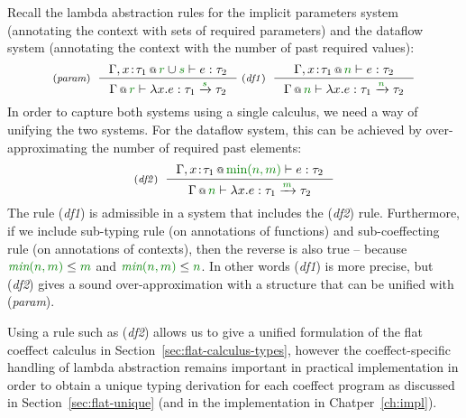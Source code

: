 Recall the lambda abstraction rules for the implicit parameters system (annotating the context
with sets of required parameters) and the dataflow system (annotating the context with the
number of past required values):
%
\begin{equation*}
\tyrule{param}
  {\coctx{\Gamma, x\!:\!\tau_1}{\cclrd{r} \cup \cclrd{s}} \vdash e : \tau_2}
  {\coctx{\Gamma}{\cclrd{r}} \vdash \lambda x.e : \tau_1 \xrightarrow{\cclrd{s}} \tau_2 }
\;
\tyrule{df1}
  {\coctx{\Gamma, x\!:\!\tau_1}{\cclrd{n}} \vdash e : \tau_2}
  {\coctx{\Gamma}{\cclrd{n}} \vdash \lambda x.e : \tau_1 \xrightarrow{\cclrd{n}} \tau_2 }
\end{equation*}
%
In order to capture both systems using a single calculus, we need a way of unifying the two
systems. For the dataflow system, this can be achieved by over-approximating the number of
required past elements:
%
\begin{equation*}
\tyrule{df2}
  {\coctx{\Gamma, x\!:\!\tau_1}{\cclrd{\textnormal{min}(n, m)}} \vdash e : \tau_2}
  {\coctx{\Gamma}{\cclrd{n}} \vdash \lambda x.e : \tau_1 \xrightarrow{\cclrd{m}} \tau_2 }
\end{equation*}
%
The rule (\emph{df1}) is admissible in a system that includes the (\emph{df2}) rule.
Furthermore, if we include sub-typing rule (on annotations of functions) and sub-coeffecting rule (on
annotations of contexts), then the reverse is also true -- because
$\cclrd{\textit{min}(n, m)} \leq \cclrd{m}$ and $\cclrd{\textit{min}(n, m)} \leq \cclrd{n}$.
In other words (\emph{df1}) is more precise, but (\emph{df2}) gives a sound over-approximation
with a structure that can be unified with (\emph{param}).

Using a rule such as (\emph{df2}) allows us to give a unified formulation of the flat coeffect
calculus in Section~\ref{sec:flat-calculus-types}, however the coeffect-specific handling of
lambda abstraction remains important in practical implementation in order to obtain a unique
typing derivation for each coeffect program as discussed in Section~\ref{sec:flat-unique}
(and in the implementation in Chatper~\ref{ch:impl}).


%
%

